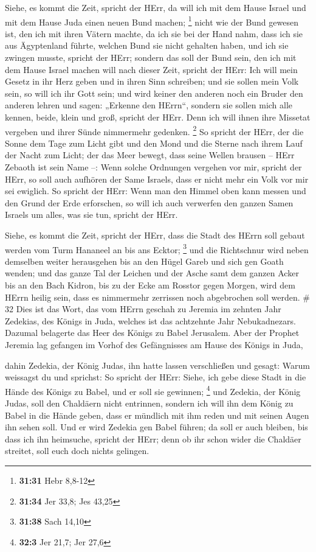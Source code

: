  Siehe, es kommt die Zeit, spricht der HErr, da will ich
mit dem Hause Israel und mit dem Hause Juda einen neuen Bund machen;
\footnote{\textbf{31:31} Hebr 8,8-12}  nicht wie der Bund
gewesen ist, den ich mit ihren Vätern machte, da ich sie bei der Hand
nahm, dass ich sie aus Ägyptenland führte, welchen Bund sie nicht
gehalten haben, und ich sie zwingen musste, spricht der HErr;
 sondern das soll der Bund sein, den ich mit dem Hause
Israel machen will nach dieser Zeit, spricht der HErr: Ich will mein
Gesetz in ihr Herz geben und in ihren Sinn schreiben; und sie sollen
mein Volk sein, so will ich ihr Gott sein;  und wird keiner
den anderen noch ein Bruder den anderen lehren und sagen: „Erkenne den
HErrn``, sondern sie sollen mich alle kennen, beide, klein und groß,
spricht der HErr. Denn ich will ihnen ihre Missetat vergeben und ihrer
Sünde nimmermehr gedenken. \footnote{\textbf{31:34} Jer 33,8; Jes 43,25}
 So spricht der HErr, der die Sonne dem Tage zum Licht gibt
und den Mond und die Sterne nach ihrem Lauf der Nacht zum Licht; der das
Meer bewegt, dass seine Wellen brausen -- HErr Zebaoth ist sein Name --:
 Wenn solche Ordnungen vergehen vor mir, spricht der HErr,
so soll auch aufhören der Same Israels, dass er nicht mehr ein Volk vor
mir sei ewiglich.  So spricht der HErr: Wenn man den Himmel
oben kann messen und den Grund der Erde erforschen, so will ich auch
verwerfen den ganzen Samen Israels um alles, was sie tun, spricht der
HErr.

 Siehe, es kommt die Zeit, spricht der HErr, dass die Stadt
des HErrn soll gebaut werden vom Turm Hananeel an bis ans Ecktor;
\footnote{\textbf{31:38} Sach 14,10}  und die Richtschnur
wird neben demselben weiter herausgehen bis an den Hügel Gareb und sich
gen Goath wenden;  und das ganze Tal der Leichen und der
Asche samt dem ganzen Acker bis an den Bach Kidron, bis zu der Ecke am
Rosstor gegen Morgen, wird dem HErrn heilig sein, dass es nimmermehr
zerrissen noch abgebrochen soll werden. \# 32  Dies ist das
Wort, das vom HErrn geschah zu Jeremia im zehnten Jahr Zedekias, des
Königs in Juda, welches ist das achtzehnte Jahr Nebukadnezars.
 Dazumal belagerte das Heer des Königs zu Babel Jerusalem.
Aber der Prophet Jeremia lag gefangen im Vorhof des Gefängnisses am
Hause des Königs in Juda,

 dahin Zedekia, der König Judas, ihn hatte lassen
verschließen und gesagt: Warum weissagst du und sprichst: So spricht der
HErr: Siehe, ich gebe diese Stadt in die Hände des Königs zu Babel, und
er soll sie gewinnen; \footnote{\textbf{32:3} Jer 21,7; Jer 27,6}
 und Zedekia, der König Judas, soll den Chaldäern nicht
entrinnen, sondern ich will ihn dem König zu Babel in die Hände geben,
dass er mündlich mit ihm reden und mit seinen Augen ihn sehen soll.
 Und er wird Zedekia gen Babel führen; da soll er auch
bleiben, bis dass ich ihn heimsuche, spricht der HErr; denn ob ihr schon
wider die Chaldäer streitet, soll euch doch nichts gelingen.

